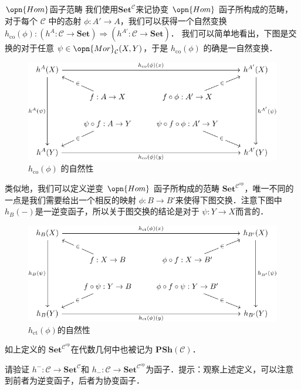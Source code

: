 \begin{definition}{$\opn{Hom}$函子范畴}
我们使用$\mathbf{Set}^\mathcal{C}$来记协变 $\opn{Hom}$ 函子所构成的范畴，对于每个 $\mathcal{C}$ 中的态射 $\phi:A'\to A$，我们可以获得一个自然变换 $h_{\text{co}}(\phi):(h^A:\mathcal{C}\to\mathbf{Set})\Rightarrow(h^{A'}:\mathcal{C}\to\mathbf{Set})$．
我们可以简单地看出，下图是交换的对于任意 $\psi\in\opn{Mor}_\mathcal{C}(X,Y)$，于是 $h_\text{co}(\phi)$ 的确是一自然变换．
\begin{figure}[h!]
\centering
\includegraphics[width=13cm]{./figures/Cat1.pdf}
\caption{$h_{\text{co}}(\phi)$ 的自然性} \label{Cat_fig1}
\end{figure}
类似地，我们可以定义逆变 $\opn{Hom}$ 函子所构成的范畴 $\mathbf{Set}^{\mathcal{C}^\text{op}}$，唯一不同的一点是我们需要给出一个相反的映射 $\phi:B\to B'$来使得下图交换．注意下图中 $h_B(-)$是一逆变函子，所以关于图交换的结论是对于 $\psi:Y\to X$而言的．
\begin{figure}[ht]
\centering
\includegraphics[width=13cm]{./figures/Cat2.pdf}
\caption{$h_{\text{ct}}(\phi)$的自然性} \label{Cat_fig2}
\end{figure}
\end{definition}
如上定义的 $\mathbf{Set}^{\mathcal{C}^\text{op}}$在代数几何中也被记为 $\mathbf{PSh}(\mathcal{C})$．
\begin{exercise}{}
请验证 $h^{-}:\mathcal{C}\to\mathbf{Set}^\mathcal{C}$和 $h_{-}:\mathcal{C}\to\mathbf{Set}^{\mathcal{C}^\text{op}}$为函子．提示：观察上述定义，可以注意到前者为逆变函子，后者为协变函子．
\end{exercise}

